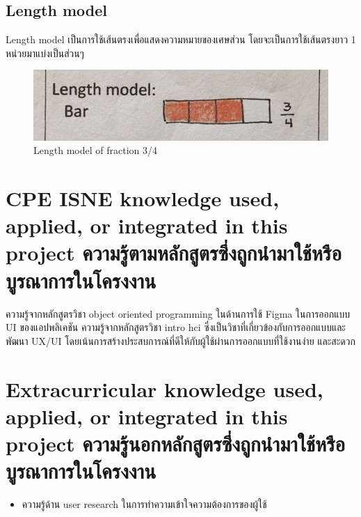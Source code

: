 \subsection{Length model}
Length model เป็นการใช้เส้นตรงเพื่อแสดงความหมายของเศษส่วน โดยจะเป็นการใช้เส้นตรงยาว 1 หน่วยมาแบ่งเป็นส่วนๆ
\begin{figure}[h!tbp]
\begin{center}
\includegraphics{Length_model.png}
\end{center}
\caption[Length model]{Length model of fraction 3/4}
\end{figure}




\section{\ifenglish%
\ifcpe CPE \else ISNE \fi knowledge used, applied, or integrated in this project
\else%
ความรู้ตามหลักสูตรซึ่งถูกนำมาใช้หรือบูรณาการในโครงงาน
\fi
}

ความรู้จากหลักสูตรวิชา object oriented programming ในด้านการใช้ Figma ในการออกแบบ UI ของแอปพลิเคชัน
ความรู้จากหลักสูตรวิชา intro hci ซึ่งเป็นวิชาที่เกี่ยวข้องกับการออกแบบและพัฒนา UX/UI โดยเน้นการสร้างประสบการณ์ที่ดีให้กับผู้ใช้ผ่านการออกแบบที่ใช้งานง่าย และสะดวก

\section{\ifenglish%
Extracurricular knowledge used, applied, or integrated in this project
\else%
ความรู้นอกหลักสูตรซึ่งถูกนำมาใช้หรือบูรณาการในโครงงาน
\fi
}

\begin{itemize}
    \item ความรู้ด้าน user research ในการทำความเข้าใจความต้องการของผู้ใช้
\end{itemize}
